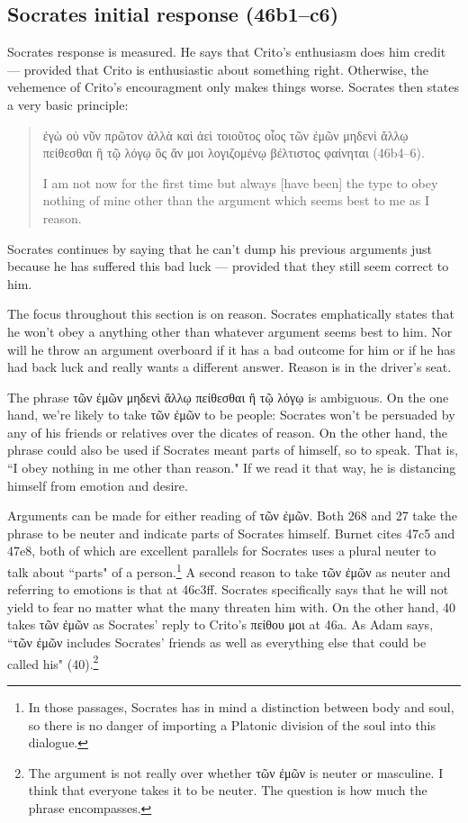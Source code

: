 \documentclass[11pt]{article}
\begin{document}
\subsection{Socrates initial response (46b1--c6)}

Socrates response is measured. He says that Crito's enthusiasm does him credit --- provided that Crito is enthusiastic about something right. Otherwise, the vehemence of Crito's encouragment only makes things worse.  Socrates then states a very basic principle:

\begin{quote}
    ἐγὼ οὐ νῦν πρῶτον ἀλλὰ καὶ ἀεὶ τοιοῦτος οἷος τῶν ἐμῶν μηδενὶ ἄλλῳ πείθεσθαι ἢ τῷ λόγῳ ὃς ἄν μοι λογιζομένῳ βέλτιστος φαίνηται (46b4--6).

    I am not now for the first time but always [have been] the type to obey nothing of mine other than the argument which seems best to me as I reason.
\end{quote}

Socrates continues by saying that he can't dump his previous arguments just because he has suffered this bad luck --- provided that they still seem correct to him.

The focus throughout this section is on reason.  Socrates emphatically states that he won't obey a anything other than whatever argument seems best to him. Nor will he throw an argument overboard if it has a bad outcome for him or if he has had back luck and really wants a different answer.  Reason is in the driver's seat.

The phrase τῶν ἐμῶν μηδενὶ ἄλλῳ πείθεσθαι ἢ τῷ λόγῳ is ambiguous.  On the one hand, we're likely to take τῶν ἐμῶν to be people: Socrates won't be persuaded by any of his friends or relatives over the dicates of reason.  On the other hand, the phrase could also be used if Socrates meant parts of himself, so to speak. That is, ``I obey nothing in me other than reason."  If we read it that way, he is distancing himself from emotion and desire.

Arguments can be made for either reading of τῶν ἐμῶν. Both \citet{burnet1924} 268 and \citet{rose1983} 27 take the phrase to be neuter and indicate parts of Socrates himself.  Burnet cites 47c5 and 47e8, both of which are excellent parallels for Socrates uses a plural neuter to talk about ``parts" of a person.\footnote{In those passages, Socrates has in mind a distinction between body and soul, so there is no danger of importing a Platonic division of the soul into this dialogue.}  A second reason to take τῶν ἐμῶν as neuter and referring to emotions is that at 46c3ff. Socrates specifically says that he will not yield to fear no matter what the many threaten him with.  On the other hand, \citet{adam1988} 40 takes τῶν ἐμῶν as Socrates' reply to Crito's πείθου μοι at 46a.  As Adam says, ``τῶν ἐμῶν includes Socrates' friends as well as everything else that could be called his" (40).\footnote{The argument is not really over whether τῶν ἐμῶν is neuter or masculine.  I think that everyone takes it to be neuter.  The question is how much the phrase encompasses.}
\end{document}
